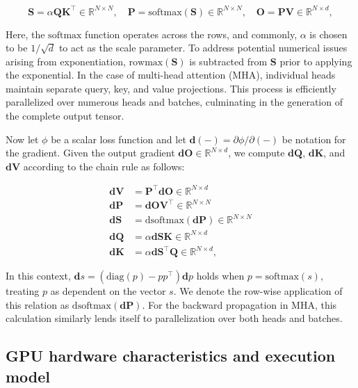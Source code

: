 \begin{equation*}
  \mathbf{S} = \alpha \mathbf{Q} \mathbf{K}^\top \in \mathbb{R}^{N \times N}, \quad \mathbf{P} = \mathrm{softmax}(\mathbf{S}) \in \mathbb{R}^{N \times N}, \quad \mathbf{O} = \mathbf{P}\mathbf{V} \in \mathbb{R}^{N \times d},
\end{equation*}

Here, the $\mathrm{softmax}$ function operates across the rows, and commonly, $\alpha$ is chosen to be $1/\sqrt{d}$ to act as the scale parameter. To address potential numerical issues arising from exponentiation, $\mathrm{rowmax}(\mathbf{S})$ is subtracted from $\mathbf{S}$ prior to applying the exponential. In the case of multi-head attention (MHA), individual heads maintain separate query, key, and value projections. This process is efficiently parallelized over numerous heads and batches, culminating in the generation of the complete output tensor.

Now let $\phi$ be a scalar loss function and let $\mathbf{d}(-) = \partial \phi / \partial (-)$ be notation for the gradient. Given the output gradient $\mathbf{dO} \in \mathbb{R}^{N \times d}$, we compute $\mathbf{dQ}$, $\mathbf{dK}$, and $\mathbf{dV}$ according to the chain rule as follows:

\begin{align*}
  \mathbf{dV} &= \mathbf{P}^\top \mathbf{dO} \in \mathbb{R}^{N \times d} \\
  \mathbf{dP} &= \mathbf{dO} \mathbf{V}^\top \in \mathbb{R}^{N \times N} \\
  \mathbf{dS} &= \mathrm{dsoftmax} (\mathbf{dP}) \in \mathbb{R}^{N \times N} \\
  \mathbf{dQ} &= \alpha \mathbf{dS} \mathbf{K} \in \mathbb{R}^{N \times d} \\
  \mathbf{dK} &= \alpha \mathbf{dS}^\top \mathbf{Q} \in \mathbb{R}^{N \times d},
\end{align*}

In this context, $\mathbf{d}s = (\mathrm{diag}(p) - p p^\top)\mathbf{d}p$ holds when $p = \mathrm{softmax}(s)$, treating $p$ as dependent on the vector $s$. We denote the row-wise application of this relation as $\mathrm{dsoftmax}(\mathbf{dP})$. For the backward propagation in MHA, this calculation similarly lends itself to parallelization over both heads and batches.

\subsection{GPU hardware characteristics and execution model}
\label{subsec:hardware}

